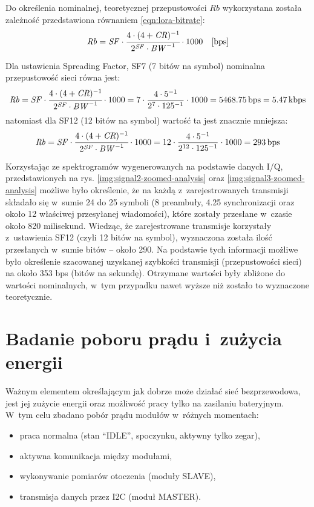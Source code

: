 Do określenia nominalnej, teoretycznej przepustowości $\mathit{Rb}$ wykorzystana została zależność przedstawiona
równaniem \ref{eqn:lora-bitrate}:
\begin{equation}\label{eqn:lora-bitrate}
    \mathit{Rb} = \mathit{SF}\cdot\cfrac{4\cdot{(4+\mathit{CR})^{-1}}}{2^{\mathit{SF}}\cdot{\mathit{BW}^{-1}}}\cdot{1000}\quad\text{[bps]}
\end{equation}

Dla ustawienia Spreading Factor, SF7 (7 bitów na symbol) nominalna przepustowość sieci równa jest:
\begin{equation*}
    \mathit{Rb} = \mathit{SF}\cdot\cfrac{4\cdot{(4+\mathit{CR})^{-1}}}{2^{\mathit{SF}}\cdot{\mathit{BW}^{-1}}}\cdot{1000} = 7 \cdot \frac{4 \cdot 5^{-1}}{2^7\cdot 125^{-1}} \cdot 1000 = 5468.75\,\text{bps} = 5.47\,\text{kbps}
\end{equation*}
natomiast dla SF12 (12 bitów na symbol) wartość ta jest znacznie mniejsza:
\begin{equation*}
    \mathit{Rb} = \mathit{SF}\cdot\cfrac{4\cdot{(4+\mathit{CR})^{-1}}}{2^{\mathit{SF}}\cdot{\mathit{BW}^{-1}}}\cdot{1000} = 12 \cdot \frac{4 \cdot 5^{-1}}{2^{12}\cdot 125^{-1}} \cdot 1000 = 293\,\text{bps}
\end{equation*}

Korzystając ze spektrogramów wygenerowanych na podstawie danych I/Q, przedstawionych na rys.
\ref{img:signal2-zoomed-analysis} oraz \ref{img:signal3-zoomed-analysis} możliwe było określenie, że na każdą
z~zarejestrowanych transmisji składało się w~sumie 24 do 25 symboli (8 preambuły, 4.25 synchronizacji oraz około 12
właściwej przesyłanej wiadomości), które zostały przesłane w~czasie około 820 milisekund. Wiedząc, że zarejestrowane
transmisje korzystały z~ustawienia SF12 (czyli 12 bitów na symbol), wyznaczona została ilość przesłanych w~sumie bitów
-- około 290. Na podstawie tych informacji możliwe było określenie szacowanej uzyskanej szybkości transmisji
(przepustowości sieci) na około 353 bps (bitów na sekundę). Otrzymane wartości były zbliżone do wartości nominalnych,
w~tym przypadku nawet wyższe niż zostało to wyznaczone teoretycznie.

\FloatBarrier
\section{\label{sect:network-power-params}Badanie poboru prądu i~zużycia energii} Ważnym elementem określającym jak
dobrze może działać sieć bezprzewodowa, jest jej zużycie energii oraz możliwość pracy tylko na zasilaniu bateryjnym.
W~tym celu zbadano pobór prądu modułów w~różnych momentach:
\begin{itemize}[label=--]
    \item praca normalna (stan \enquote{IDLE}, spoczynku, aktywny tylko zegar),
    \item aktywna komunikacja między modułami,
    \item wykonywanie pomiarów otoczenia (moduły SLAVE),
    \item transmisja danych przez I2C (moduł MASTER).
\end{itemize}

